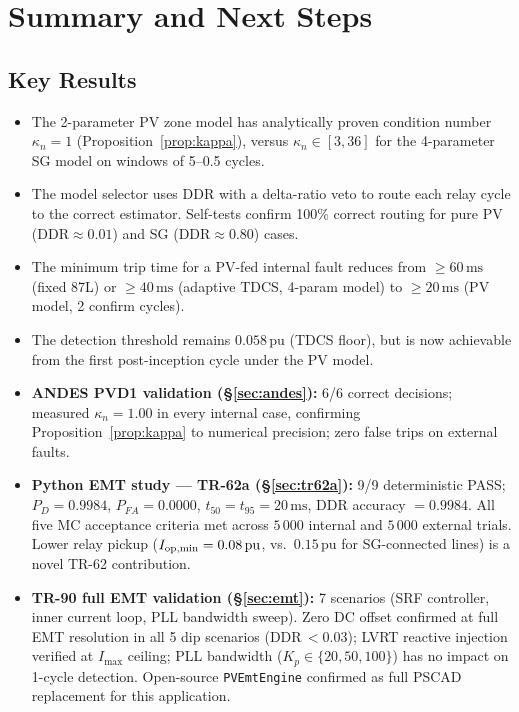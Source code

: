 \documentclass[11pt, a4paper]{article}
\newcommand{\pu}{\,\text{pu}}
\newcommand{\ms}{\,\text{ms}}
\newcommand{\kn}{\kappa_n}
\begin{document}
\section{Summary and Next Steps}
\label{sec:summary}

\subsection{Key Results}

\begin{itemize}
  \item The 2-parameter PV zone model has analytically proven condition number
    $\kn = 1$ (Proposition~\ref{prop:kappa}), versus $\kn \in [3, 36]$ for the
    4-parameter SG model on windows of 5--0.5 cycles.

  \item The model selector uses DDR with a delta-ratio veto to route each
    relay cycle to the correct estimator.  Self-tests confirm 100\% correct
    routing for pure PV (DDR$\approx 0.01$) and SG (DDR$\approx 0.80$) cases.

  \item The minimum trip time for a PV-fed internal fault reduces from
    $\geq 60\ms$ (fixed 87L) or $\geq 40\ms$ (adaptive TDCS, 4-param model)
    to $\geq 20\ms$ (PV model, 2 confirm cycles).

  \item The detection threshold remains $0.058\pu$ (TDCS floor), but is now
    achievable from the first post-inception cycle under the PV model.

  \item \textbf{ANDES PVD1 validation (§\ref{sec:andes}):}  6/6 correct
    decisions; measured $\kn = 1.00$ in every internal case, confirming
    Proposition~\ref{prop:kappa} to numerical precision; zero false trips
    on external faults.

  \item \textbf{Python EMT study — TR-62a (§\ref{sec:tr62a}):}
    9/9 deterministic PASS; $P_D = 0.9984$, $P_{FA} = 0.0000$,
    $t_{50} = t_{95} = 20\,\text{ms}$, DDR accuracy $= 0.9984$.
    All five MC acceptance criteria met across $5\,000$ internal
    and $5\,000$ external trials.  Lower relay pickup
    ($I_{\rm op,min}=0.08\pu$, vs.\ $0.15\pu$ for SG-connected lines)
    is a novel TR-62 contribution.

  \item \textbf{TR-90 full EMT validation (§\ref{sec:emt}):}
    7 scenarios (SRF controller, inner current loop, PLL bandwidth sweep).
    Zero DC offset confirmed at full EMT resolution in all 5 dip scenarios
    (DDR\,$<0.03$); LVRT reactive injection verified at $I_{\max}$ ceiling;
    PLL bandwidth ($K_p \in \{20,50,100\}$) has no impact on 1-cycle
    detection.  Open-source \texttt{PVEmtEngine} confirmed as full PSCAD
    replacement for this application.
\end{itemize}
\end{document}

